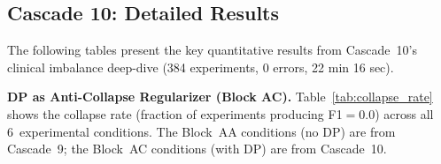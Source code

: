\documentclass[conference]{IEEEtran}
\begin{document}
\begin{table}[htbp]
\centering
\caption{DP composition: total $\varepsilon$ after $k$ sequential studies (Block~R, 45 experiments). RDP ratio: na\"ive$/$RDP improvement factor.}
\label{tab:dp_composition}
\end{table}

\subsection{Cascade 10: Detailed Results}

The following tables present the key quantitative results from Cascade~10's clinical imbalance deep-dive (384 experiments, 0 errors, 22 min 16 sec).

\smallskip\noindent\textbf{DP as Anti-Collapse Regularizer (Block AC).} Table~\ref{tab:collapse_rate} shows the collapse rate (fraction of experiments producing F1$=$0.0) across all 6~experimental conditions. The Block~AA conditions (no DP) are from Cascade~9; the Block~AC conditions (with DP) are from Cascade~10.
\end{document}
